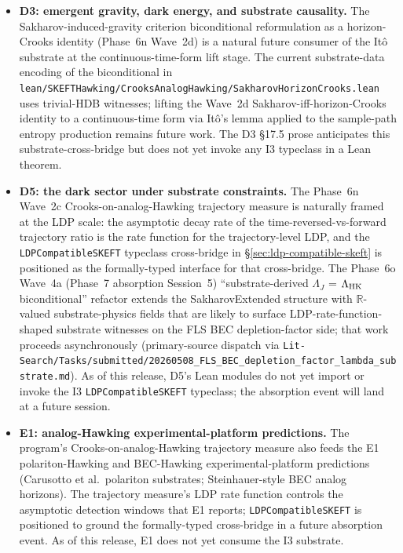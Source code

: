 \documentclass[11pt]{article}
\begin{document}
\begin{itemize}
\item \textbf{D3: emergent gravity, dark energy, and substrate
  causality.} The Sakharov-induced-gravity criterion biconditional
  reformulation as a horizon-Crooks identity (Phase~6n Wave~2d) is
  a natural future consumer of the It\^o substrate at the
  continuous-time-form lift stage. The current substrate-data
  encoding of the biconditional in
  \texttt{lean/SKEFTHawking/CrooksAnalogHawking/SakharovHorizonCrooks.lean}
  uses trivial-HDB witnesses; lifting the Wave~2d
  Sakharov-iff-horizon-Crooks identity to a continuous-time form via
  It\^o's lemma applied to the sample-path entropy production
  remains future work. The D3 §17.5 prose anticipates this
  substrate-cross-bridge but does not yet invoke any I3 typeclass
  in a Lean theorem.

\item \textbf{D5: the dark sector under substrate constraints.}
  The Phase~6n Wave~2c Crooks-on-analog-Hawking trajectory measure
  is naturally framed at the LDP scale: the asymptotic decay rate
  of the time-reversed-vs-forward trajectory ratio is the rate
  function for the trajectory-level LDP, and the
  \texttt{LDPCompatibleSKEFT} typeclass cross-bridge in
  \S\ref{sec:ldp-compatible-skeft} is positioned as the
  formally-typed interface for that cross-bridge. The Phase~6o
  Wave~4a (Phase~7 absorption Session~5) ``substrate-derived
  $\Lambda_J$ = $\Lambda_{\rm HK}$ biconditional'' refactor extends
  the SakharovExtended structure with $\mathbb{R}$-valued
  substrate-physics fields that are likely to surface
  LDP-rate-function-shaped substrate witnesses on the FLS BEC
  depletion-factor side; that work proceeds asynchronously
  (primary-source dispatch via
  \texttt{Lit-Search/Tasks/submitted/20260508\_FLS\_BEC\_depletion\_factor\_lambda\_substrate.md}).
  As of this release, D5's Lean modules do not yet import or
  invoke the I3 \texttt{LDPCompatibleSKEFT} typeclass; the absorption
  event will land at a future session.

\item \textbf{E1: analog-Hawking experimental-platform
  predictions.} The program's Crooks-on-analog-Hawking trajectory
  measure also feeds the E1 polariton-Hawking and BEC-Hawking
  experimental-platform predictions (Carusotto et al.\ polariton
  substrates; Steinhauer-style BEC analog horizons). The trajectory
  measure's LDP rate function controls the asymptotic detection
  windows that E1 reports; \texttt{LDPCompatibleSKEFT} is positioned
  to ground the formally-typed cross-bridge in a future absorption
  event. As of this release, E1 does not yet consume the I3
  substrate.
\end{itemize}
\end{document}
